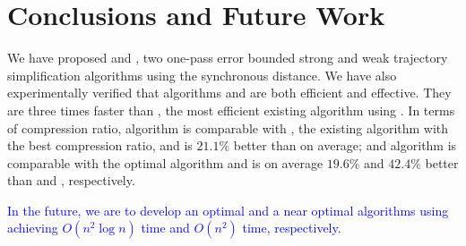 \section{Conclusions and Future Work}
\label{sec-conclusion}

We have proposed \cist and \cista, two one-pass error bounded strong and weak trajectory simplification algorithms using the synchronous distance.
We have also experimentally verified that algorithms \cist and \cista are both efficient and effective.
They are three times faster than \squishe, the most efficient existing \lsa algorithm using \sed.
%
In terms of compression ratio, 
algorithm \cist is {comparable} with \dps, the existing \lsa algorithm with the best compression ratio, and is $21.1\%$ better than \squishe on average; and 
algorithm \cista is comparable with the optimal algorithm and is on average $19.6\%$ and $42.4\%$ better than \dps and \squishe, respectively.

\textcolor{blue}{In the future, we are to develop an optimal and a near optimal algorithms using \sed achieving $O(n^2\log n)$ time and $O(n^2)$ time, respectively.}